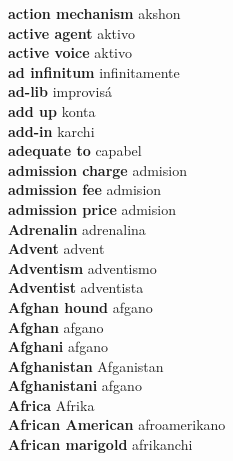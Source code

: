 \textbf{ action mechanism  } akshon \\
\textbf{ active agent  } aktivo \\
\textbf{ active voice  } aktivo \\
\textbf{ ad infinitum  } infinitamente \\
\textbf{ ad-lib  } improvisá \\
\textbf{ add up  } konta \\
\textbf{ add-in  } karchi \\
\textbf{ adequate to  } capabel \\
\textbf{ admission charge  } admision \\
\textbf{ admission fee  } admision \\
\textbf{ admission price  } admision \\
\textbf{ Adrenalin  } adrenalina \\
\textbf{ Advent  } advent \\
\textbf{ Adventism  } adventismo \\
\textbf{ Adventist  } adventista \\
\textbf{ Afghan hound  } afgano \\
\textbf{ Afghan  } afgano \\
\textbf{ Afghani  } afgano \\
\textbf{ Afghanistan  } Afganistan \\
\textbf{ Afghanistani  } afgano \\
\textbf{ Africa  } Afrika \\
\textbf{ African American  } afroamerikano \\
\textbf{ African marigold  } afrikanchi \\
